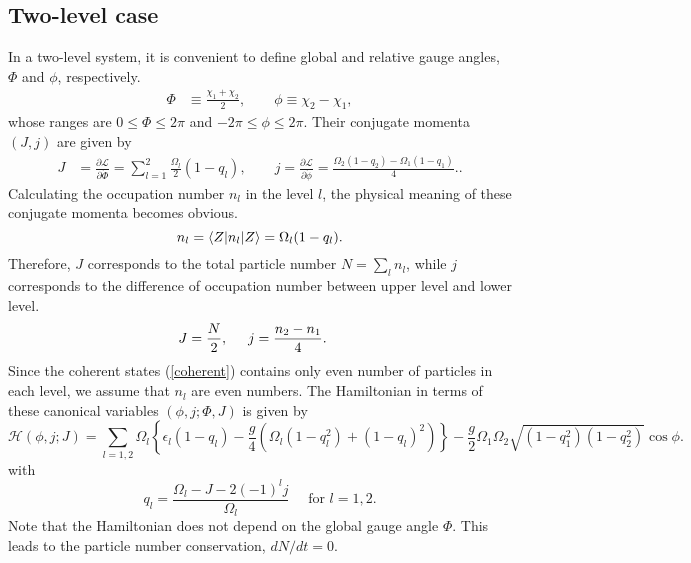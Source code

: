 \documentclass[%
superscriptaddress,
preprint,
showpacs,
nofootinbib,
amsmath,amssymb,
prc,
floatfix ]%
{revtex4-1}
\begin{document}
\subsection{Two-level case}

In a two-level system,
it is convenient to define global and relative gauge angles,
$\Phi$ and $\phi$, respectively.
\begin{align}
  \Phi &\equiv \frac{\chi_1 + \chi_2}{2}, \quad\quad
\phi\equiv \chi_2 - \chi_1,
\label{phi}
\end{align}
whose ranges are $0\leq \Phi \leq 2\pi$ and $-2\pi \leq \phi \leq 2\pi$.
Their conjugate momenta $(J,j)$ are given by
\begin{align}
	J &= \frac{\partial\mathcal{L}}{\partial\dot{\Phi}} =  \sum_{l=1}^2 \frac{\Omega_l}{2}(1-q_l), 
\quad\quad
j = \frac{\partial\mathcal{L}}{\partial\dot{\phi}} = \frac{\Omega_2(1-q_2) - \Omega_1(1-q_1)}{4}. \label{pi} .
\end{align}
Calculating the occupation number $n_l$ in the level $l$,
the physical meaning of these conjugate momenta becomes obvious.
\begin{equation}
   n_l = \braket{Z|n_l|Z} %
	= \Omega_l(1-q_l) .
\end{equation}
Therefore, $J$ corresponds to the total particle number
$N=\sum_l n_l$,
while $j$ corresponds to the difference of occupation number
between upper level and lower level. 
\begin{align}
  J &= \frac{N}{2}, \hspace{5mm} j = \frac{n_{2}-n_{1}}{4} .
  \label{momentum}
\end{align}
Since the coherent states (\ref{coherent}) contains only even number of
particles in each level,
we assume that $n_l$ are even numbers.
The Hamiltonian in terms of these canonical variables
$(\phi,j;\Phi,J)$ is given by
\begin{equation}
\mathcal{H}(\phi,j;J)
	= \sum_{l=1,2} \Omega_l \left\{ \epsilon_l(1- q_l)
	- \frac{g}{4} (\Omega_l(1-q_l^2)+(1-q_l)^2) \right\}
- \frac{g}{2}\Omega_1\Omega_2
	\sqrt{(1-q_1^2)(1-q_2^2)} \cos\phi .
\label{TDHFB_Hamiltonian_3}
\end{equation}
with
\begin{equation}
	q_l=\frac{\Omega_l - J -2(-1)^l j}{\Omega_l} 
	\quad \mbox{ for } l=1,2.
	\label{q_l}
\end{equation}
Note that the Hamiltonian does not depend on the global gauge angle $\Phi$.
This leads to the particle number conservation, $dN/dt=0$.
\end{document}
